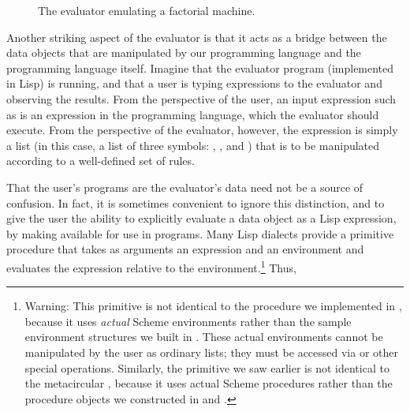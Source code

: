 \begin{figure}[tb]
\label{Figure 4.3}
\centering
\begin{comment}
\heading{Figure 4.3:} The evaluator emulating a factorial machine.

\begin{example}
                   +--------+
            6 ---->|  eval  |----> 720
                   +--------+
                       /
             . . .    /  . . .
       . . .       ../. .      .
     .                           ..
    .   (define (factorial n)      . . .
   .      (if (= n 1)                   . .
    .         1                            .
    .         (* (factorial (- n 1)) n)))   .
      . .                       . .        .
          . .  . .      . . . .     . . . .
                   . ..
\end{example}
\end{comment}

\par\bigskip
\noindent
{} The evaluator emulating a factorial machine.
\end{figure}

Another striking aspect of the evaluator is that it acts as a bridge between
the data objects that are manipulated by our programming language and the
programming language itself.  Imagine that the evaluator program (implemented
in Lisp) is running, and that a user is typing expressions to the evaluator and
observing the results.  From the perspective of the user, an input expression
such as  is an expression in the programming language, which the
evaluator should execute.  From the perspective of the evaluator, however, the
expression is simply a list (in this case, a list of three symbols: \code{*},
, and ) that is to be manipulated according to a well-defined
set of rules.

That the user's programs are the evaluator's data need not be a source of
confusion.  In fact, it is sometimes convenient to ignore this distinction, and
to give the user the ability to explicitly evaluate a data object as a Lisp
expression, by making  available for use in programs.  Many Lisp
dialects provide a primitive  procedure that takes as arguments an
expression and an environment and evaluates the expression relative to the
environment.\footnote{Warning: This  primitive is not identical to
the  procedure we implemented in , because it
uses \emph{actual} Scheme environments rather than the sample environment
structures we built in .  These actual environments cannot
be manipulated by the user as ordinary lists; they must be accessed via
 or other special operations.  Similarly, the  primitive
we saw earlier is not identical to the metacircular , because it
uses actual Scheme procedures rather than the procedure objects we constructed
in  and .} Thus,

